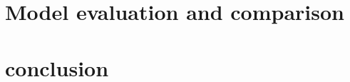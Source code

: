\documentclass{svjour3}
\begin{document}
  
  
  
  
  
  \section{Model evaluation and comparison}
  
  
  
  
  
  \section{conclusion}
  
















\clearpage


\end{document}
